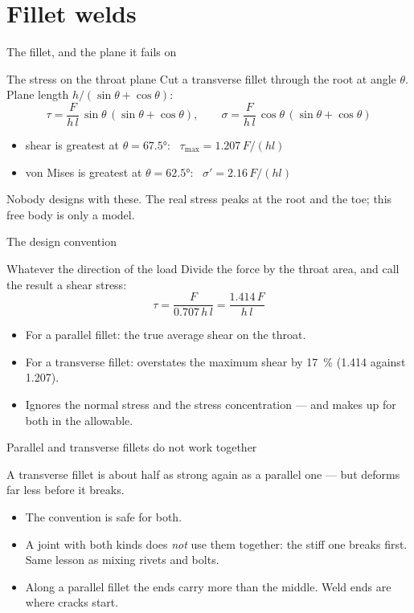 \documentclass[aspectratio=169,10pt]{beamer}
\begin{document}
\section{Fillet welds}

\begin{frame}{The fillet, and the plane it fails on}
\centering
\resizebox{0.92\textwidth}{!}{}
\end{frame}

\begin{frame}{The stress on the throat plane}
Cut a transverse fillet through the root at angle $\theta$. Plane length
$h/(\sin\theta+\cos\theta)$:
\[ \tau=\frac{F}{h\,l}\,\sin\theta\,(\sin\theta+\cos\theta),\qquad
   \sigma=\frac{F}{h\,l}\,\cos\theta\,(\sin\theta+\cos\theta) \]
\begin{itemize}
  \item shear is greatest at $\theta=\ang{67.5}$: \ $\tau_{\max}=1.207\,F/(hl)$
  \item von Mises is greatest at $\theta=\ang{62.5}$: \ $\sigma'=2.16\,F/(hl)$
\end{itemize}
\vfill
\alert{Nobody designs with these.} The real stress peaks at the root and the toe; this free body
is only a model.
\end{frame}

\begin{frame}{The design convention}
\begin{block}{Whatever the direction of the load}
Divide the force by the throat area, and call the result a shear stress:
\[ \tau=\frac{F}{0.707\,h\,l}=\frac{1.414\,F}{h\,l} \]
\end{block}
\begin{itemize}
  \item For a parallel fillet: the true average shear on the throat.
  \item For a transverse fillet: overstates the maximum shear by \SI{17}{\percent} (1.414 against 1.207).
  \item Ignores the normal stress and the stress concentration --- and makes up for both in the allowable.
\end{itemize}
\end{frame}

\begin{frame}{Parallel and transverse fillets do not work together}
\centering
\resizebox{0.86\textwidth}{!}{}

\vfill\raggedright
A transverse fillet is about \alert{half as strong again} as a parallel one --- but deforms far
less before it breaks.
\begin{itemize}
  \item The convention is safe for both.
  \item A joint with both kinds does \emph{not} use them together: the stiff one breaks first.
        Same lesson as mixing rivets and bolts.
  \item Along a parallel fillet the \alert{ends} carry more than the middle. Weld ends are where
        cracks start.
\end{itemize}
\end{frame}
\end{document}
